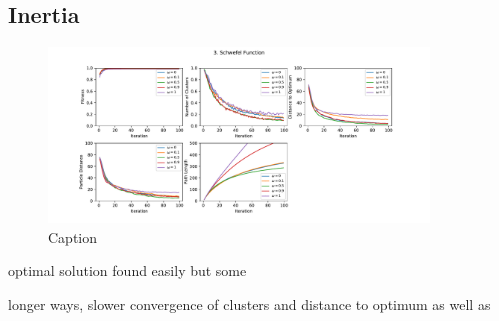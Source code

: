 \documentclass[12pt]{article}
\begin{document}
\subsection{Inertia}

\begin{figure}
	\centering
	\includegraphics[width=0.9\textwidth]{figures/ex3/ex3-3.pdf}
	Caption
	\label{fig:ex3-3}
\end{figure}


optimal solution found easily but some 

longer ways, slower convergence of clusters and distance to optimum as well as 
\end{document}

